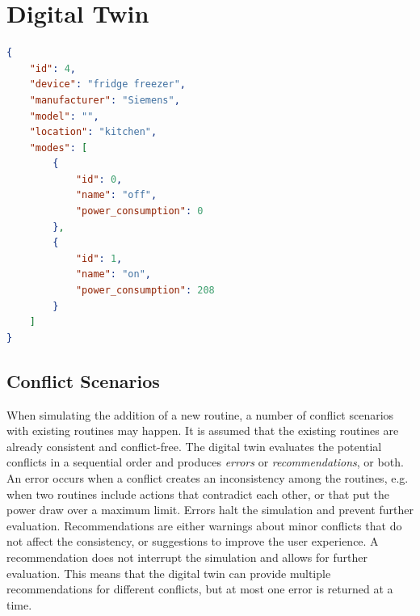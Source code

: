 \chapter{Digital Twin}\label{ch:digital_twin}

\begin{lstlisting}[language=json,caption={JSON file describing the fridge.},label=fridge_json,float,floatplacement=H]
{
    "id": 4,
    "device": "fridge freezer",
    "manufacturer": "Siemens",
    "model": "",
    "location": "kitchen",
    "modes": [
        {
            "id": 0,
            "name": "off",
            "power_consumption": 0
        },
        {
            "id": 1,
            "name": "on",
            "power_consumption": 208
        }
    ]
}
\end{lstlisting}

\section{Conflict Scenarios}

When simulating the addition of a new routine, a number of conflict scenarios with existing routines may happen. It is assumed that the existing routines are already consistent and conflict-free. The digital twin evaluates the potential conflicts in a sequential order and produces \textit{errors} or \textit{recommendations}, or both. An error occurs when a conflict creates an inconsistency among the routines, e.g. when two routines include actions that contradict each other, or that put the power draw over a maximum limit. Errors halt the simulation and prevent further evaluation. Recommendations are either warnings about minor conflicts that do not affect the consistency, or suggestions to improve the user experience. A recommendation does not interrupt the simulation and allows for further evaluation. This means that the digital twin can provide multiple recommendations for different conflicts, but at most one error is returned at a time.


